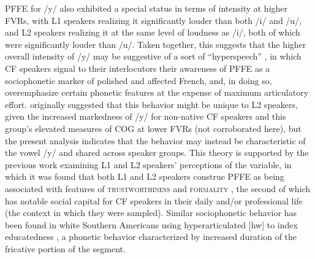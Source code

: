 \documentclass[output=paper,colorlinks,citecolor=brown,draftmode]{langscibook}
\begin{document}
PFFE for /y/ also exhibited a special status in terms of intensity at higher FVRs, with L1 speakers realizing it significantly louder than both /i/ and /u/, and L2 speakers realizing it at the same level of loudness as /i/, both of which were significantly louder than /u/. Taken together, this suggests that the higher overall intensity of /y/ may be suggestive of a sort of “hyperspeech” \citep{lindblom1990explaining}, in which CF speakers signal to their interlocutors their awareness of PFFE as a sociophonetic marker of polished and affected French, and, in doing so, overemphasize certain phonetic features at the expense of maximum articulatory effort. \citet{dalola2020redefining} originally suggested that this behavior might be unique to L2 speakers, given the increased markedness of /y/ for non-native CF speakers and this group’s elevated measures of COG at lower FVRs (not corroborated here), but the present analysis indicates that the behavior may instead be characteristic of the vowel /y/ and shared across speaker groups. This theory is supported by the previous work examining L1 and L2 speakers’ perceptions of the variable, in which it was found that both L1 and L2 speakers construe PFFE as being associated with features of \textsc{trustworthiness} and \textsc{formality} \citep{dalola2016perception},  the second of which has notable social capital for CF speakers in their daily and/or professional life (the context in which they were sampled). Similar sociophonetic behavior has been found in white Southern Americans using hyperarticulated [hw] to index educatedness \citep{bridwell2019distribution}, a phonetic behavior characterized by increased duration of the fricative portion of the segment.
\end{document}
